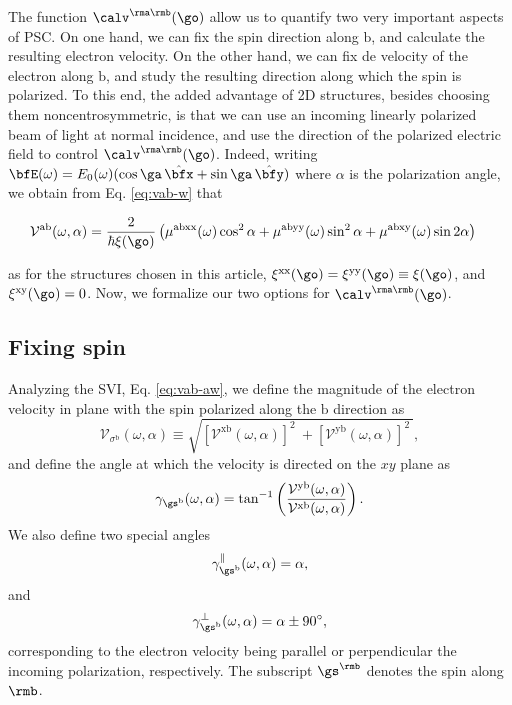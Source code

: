 \documentclass[floatfix,prb,aps,superscriptaddress,showpacs,11pt,preprint,letterpaper]{revtex4}
\begin{document}
The function $\calv^{\rma\rmb}(\go)$ allow us to quantify two very
important aspects of PSC. On one hand, we can fix the spin direction
along $\mathrm{b}$,   
and calculate the resulting electron velocity.  
On the other hand, we can fix de velocity of the electron
along $\mathrm{b}$,  and study the resulting direction along which the
spin is polarized.
To this end, the added advantage of  2D structures, besides choosing
them noncentrosymmetric, is that we can use an incoming linearly
polarized beam of light
at normal incidence, and use the  direction of the polarized  electric
field to control $\calv^{\rma\rmb}(\go)$.
Indeed, writing 
$\bfE(\omega) = E_0(\omega)(\cos\ga\,\hat\bfx+\sin\ga\,\hat\bfy)$
where $\alpha$ is the polarization angle, we obtain from
 Eq. \eqref{eq:vab-w}
that
\begin{widetext}
\begin{align}
\mathcal{V}^{\mathrm{ab}}(\omega,\alpha)
&= 
\frac{2}{\hbar\xi(\go)}
\left(\mu^{\mathrm{abxx}}(\omega)\cos^{2}\alpha + 
\mu^{\mathrm{abyy}}(\omega)\sin^{2}\alpha + 
\mu^{\mathrm{abxy}}(\omega)\sin 2\alpha\right)
\label{eq:vab-aw}
\end{align}
\end{widetext}
as for the structures chosen in this article,
$\xi^{\mathrm{xx}}(\go)=\xi^{\mathrm{yy}}(\go)\equiv\xi(\go)$, and $\xi^{\mathrm{xy}}(\go)=0$.
Now, we formalize our two options for $\calv^{\rma\rmb}(\go)$.

\subsection{Fixing spin}\label{sec:theory-fixspin}

Analyzing the SVI, Eq. \eqref{eq:vab-aw}, we define the magnitude of
the electron velocity in plane
with the spin polarized along the $\mathrm{b}$ direction as
\begin{equation}
\mathcal{V}_{\sigma^{\mathrm{b}}}(\omega,\alpha)
\equiv
\sqrt{
[\mathcal{V}^{\mathrm{xb}}(\omega,\alpha)]^{2}\ +
[\mathcal{V}^{\mathrm{yb}}(\omega,\alpha)]^{2}\ 
}, 
\label{eq:vs-mag}
\end{equation}
and define the angle at which the velocity is directed on the $xy$ plane as
\begin{equation}
\gamma_{\gs^\mathrm{b}} (\omega,\alpha)
=
\tan^{-1} \left( \frac{\mathcal{V}^{\mathrm{yb}}(\omega,\alpha)}
{\mathcal{V}^{\mathrm{xb}}(\omega,\alpha)} \right)
.
\label{eq:gamma-ang}
\end{equation}
We also define two special angles
\begin{equation}
\gamma_{\gs^\mathrm{b}}^\parallel(\omega,\alpha) = \alpha, 
\label{eq:gamma-par} 
\end{equation}
and
\begin{equation}
\gamma_{\gs^\mathrm{b}}^\perp(\omega,\alpha) = \alpha \pm 90^{\circ},
\label{eq:gamma-perp}
\end{equation}
corresponding to the electron velocity being parallel or perpendicular
the incoming polarization, 
respectively. The subscript $\gs^\rmb$ denotes the spin along $\rmb$.
\end{document}
